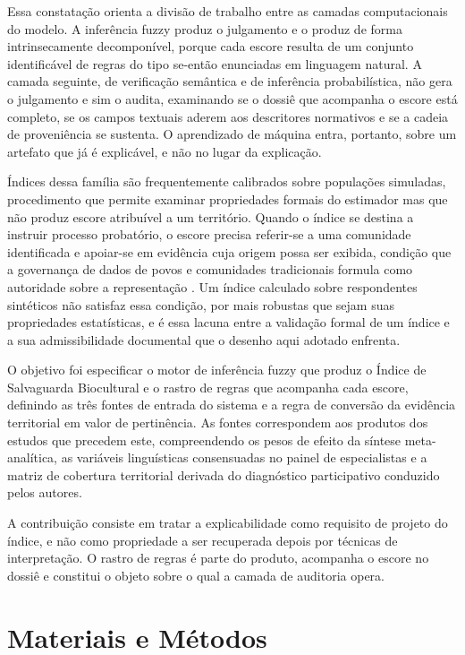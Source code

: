 \documentclass[pdflatex,sn-basic]{sn-jnl}%
\theoremstyle{thmstyleone}%
\theoremstyle{thmstyletwo}%
\theoremstyle{thmstylethree}%
\begin{document}
Essa constatação orienta a divisão de trabalho entre as camadas computacionais do modelo. A inferência fuzzy produz o julgamento e o produz de forma intrinsecamente decomponível, porque cada escore resulta de um conjunto identificável de regras do tipo se-então enunciadas em linguagem natural. A camada seguinte, de verificação semântica e de inferência probabilística, não gera o julgamento e sim o audita, examinando se o dossiê que acompanha o escore está completo, se os campos textuais aderem aos descritores normativos e se a cadeia de proveniência se sustenta. O aprendizado de máquina entra, portanto, sobre um artefato que já é explicável, e não no lugar da explicação.

Índices dessa família são frequentemente calibrados sobre populações simuladas, procedimento que permite examinar propriedades formais do estimador mas que não produz escore atribuível a um território. Quando o índice se destina a instruir processo probatório, o escore precisa referir-se a uma comunidade identificada e apoiar-se em evidência cuja origem possa ser exibida, condição que a governança de dados de povos e comunidades tradicionais formula como autoridade sobre a representação \cite{Carroll2020,Samuel2021}. Um índice calculado sobre respondentes sintéticos não satisfaz essa condição, por mais robustas que sejam suas propriedades estatísticas, e é essa lacuna entre a validação formal de um índice e a sua admissibilidade documental que o desenho aqui adotado enfrenta.

O objetivo foi especificar o motor de inferência fuzzy que produz o Índice de Salvaguarda Biocultural e o rastro de regras que acompanha cada escore, definindo as três fontes de entrada do sistema e a regra de conversão da evidência territorial em valor de pertinência. As fontes correspondem aos produtos dos estudos que precedem este, compreendendo os pesos de efeito da síntese meta-analítica, as variáveis linguísticas consensuadas no painel de especialistas e a matriz de cobertura territorial derivada do diagnóstico participativo conduzido pelos autores.

A contribuição consiste em tratar a explicabilidade como requisito de projeto do índice, e não como propriedade a ser recuperada depois por técnicas de interpretação. O rastro de regras é parte do produto, acompanha o escore no dossiê e constitui o objeto sobre o qual a camada de auditoria opera.

\section{Materiais e Métodos}
\end{document}
